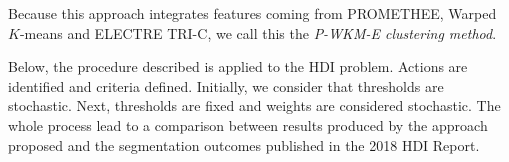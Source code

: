\documentclass[]{elsarticle}
\theoremstyle{definition}
\begin{document}
Because this approach integrates features coming from PROMETHEE, Warped $K$-means and ELECTRE TRI-C,  we call this the \emph{P-WKM-E clustering method}.

Below, the procedure described is applied to the HDI problem.  Actions are identified and criteria defined.  Initially, we consider that thresholds are stochastic. Next, thresholds are fixed and weights are considered stochastic.   The whole process lead to a comparison between results produced by the approach proposed and the segmentation outcomes  published in the 2018 HDI Report.
 

%
%
\end{document}
